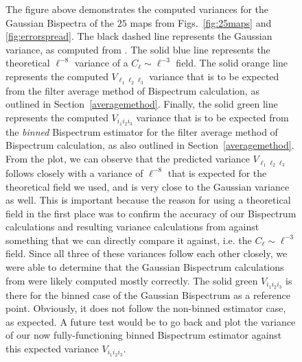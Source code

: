 \documentclass[11pt]{article}
\renewcommand{\_}[1]{\underline{ #1 }}
\begin{document}
{\begin{figure}[H]
    \centering
    \caption{The figure above demonstrates the computed variances for the Gaussian Bispectra of the $25$ maps from Figs.~\ref{fig:25maps} and \ref{fig:errorspread}. The black dashed line represents the Gaussian variance, as computed from \cite{Munshi_2020}. The solid blue line represents the theoretical $\ell^{-8}$ variance of a $C_{\ell} \sim \ell^{-3}$ field. The solid orange line represents the computed $V_{\ell_1 \ell_2 \ell_3}$ variance that is to be expected from the filter average method of Bispectrum calculation, as outlined in Section~\ref{averagemethod}. Finally, the solid green line represents the computed $V_{i_1 i_2 i_3}$ variance that is to be expected from the \textit{binned} Bispectrum estimator for the filter average method of Bispectrum calculation, as also outlined in Section~\ref{averagemethod}. From the plot, we can observe that the predicted variance $V_{\ell_1 \ell_2 \ell_3}$ follows closely with a variance of $\ell^{-8}$ that is expected for the theoretical field we used, and is very close to the Gaussian variance as well. This is important because the reason for using a theoretical field in the first place was to confirm the accuracy of our Bispectrum calculations and resulting variance calculations from \cite{Munshi_2020} against something that we can directly compare it against, i.e. the $C_{\ell} \sim \ell^{-3}$ field. Since all three of these variances follow each other closely, we were able to determine that the Gaussian Bispectrum calculations from \cite{Munshi_2020} were likely computed mostly correctly. The solid green $V_{i_1 i_2 i_3}$ is there for the binned case of the Gaussian Bispectrum as a reference point. Obviously, it does not follow the non-binned estimator case, as expected. A future test would be to go back and plot the variance of our now fully-functioning binned Bispectrum estimator against this expected variance $V_{i_1 i_2 i_3}$.}\label{fig:variance}
\end{figure}

}
\end{document}
